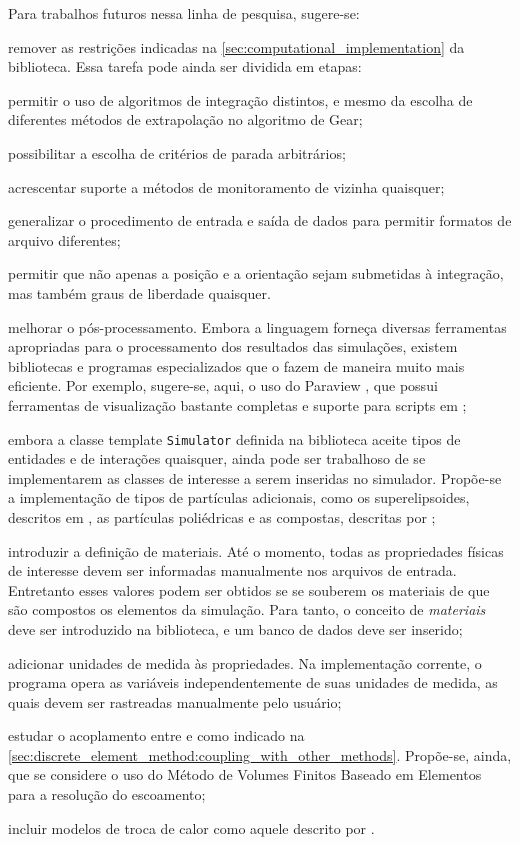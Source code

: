 Para trabalhos futuros nessa linha de pesquisa, sugere-se:
\begin{alineas}
\item remover as restrições indicadas na \cref{sec:computational_implementation} da biblioteca. Essa tarefa pode ainda ser dividida em etapas:
	\begin{alineas}
	\item permitir o uso de algoritmos de integração distintos, e mesmo da escolha de diferentes métodos de extrapolação no algoritmo de Gear;
	\item possibilitar a escolha de critérios de parada arbitrários;
	\item acrescentar suporte a métodos de monitoramento de vizinha quaisquer;
	\item generalizar o procedimento de entrada e saída de dados para permitir formatos de arquivo diferentes;
	\item permitir que não apenas a posição e a orientação sejam submetidas à integração, mas também graus de liberdade quaisquer.
	\end{alineas}
\item melhorar o pós-processamento. Embora a linguagem \Python{} forneça diversas ferramentas apropriadas para o processamento dos resultados das simulações, existem bibliotecas e programas especializados que o fazem de maneira muito mais eficiente. Por exemplo, sugere-se, aqui, o uso do Paraview \cite{bib:paraview_book,bib:paraview_handbook}, que possui ferramentas de visualização bastante completas e suporte para scripts em \Python{};
\item embora a classe template \lstinline[style=Inline C++]{Simulator} definida na biblioteca aceite tipos de entidades e de interações quaisquer, ainda pode ser trabalhoso de se implementarem as classes de interesse a serem inseridas no simulador. Propõe-se a implementação de tipos de partículas adicionais, como os superelipsoides, descritos em , as partículas poliédricas e as compostas, descritas por ;
\item introduzir a definição de materiais. Até o momento, todas as propriedades físicas de interesse devem ser informadas manualmente nos arquivos de entrada. Entretanto esses valores podem ser obtidos se se souberem os materiais de que são compostos os elementos da simulação. Para tanto, o conceito de \textit{materiais} deve ser introduzido na biblioteca, e um banco de dados deve ser inserido;
\item adicionar unidades de medida às propriedades. Na implementação corrente, o programa opera as variáveis independentemente de suas unidades de medida, as quais devem ser rastreadas manualmente pelo usuário;
\item estudar o acoplamento entre \DEM{} e \CFD{} como indicado na \cref{sec:discrete_element_method:coupling_with_other_methods}. Propõe-se, ainda, que se considere o uso do Método de Volumes Finitos Baseado em Elementos para a resolução do escoamento;
\item incluir modelos de troca de calor como aquele descrito por .
\end{alineas}

